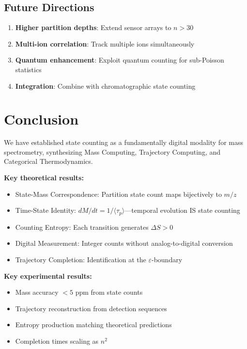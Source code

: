 \documentclass[twocolumn,10pt]{article}
\newcommand{\eps}{\varepsilon}
\begin{document}
\subsection{Future Directions}

\begin{enumerate}
    \item \textbf{Higher partition depths}: Extend sensor arrays to $n > 30$
    \item \textbf{Multi-ion correlation}: Track multiple ions simultaneously
    \item \textbf{Quantum enhancement}: Exploit quantum counting for sub-Poisson statistics
    \item \textbf{Integration}: Combine with chromatographic state counting
\end{enumerate}

\section{Conclusion}

We have established state counting as a fundamentally digital modality for mass spectrometry, synthesizing Mass Computing, Trajectory Computing, and Categorical Thermodynamics.

\textbf{Key theoretical results:}
\begin{itemize}
    \item State-Mass Correspondence: Partition state count maps bijectively to $m/z$
    \item Time-State Identity: $dM/dt = 1/\langle\tau_p\rangle$---temporal evolution IS state counting
    \item Counting Entropy: Each transition generates $\Delta S > 0$
    \item Digital Measurement: Integer counts without analog-to-digital conversion
    \item Trajectory Completion: Identification at the $\eps$-boundary
\end{itemize}

\textbf{Key experimental results:}
\begin{itemize}
    \item Mass accuracy $<5$ ppm from state counts
    \item Trajectory reconstruction from detection sequences
    \item Entropy production matching theoretical predictions
    \item Completion times scaling as $n^2$
\end{itemize}
\end{document}
